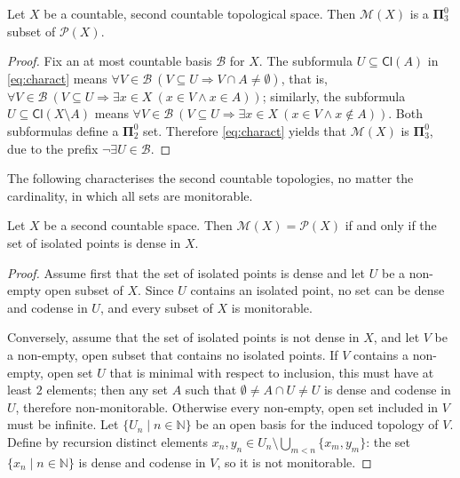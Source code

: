 \documentclass{lmcs}
\newcommand{\N}{\mathbb N}
\newcommand{\bpi}{\boldsymbol\Pi}
\newcommand{\Cl}[1]{\mathsf{Cl}(#1)}
\begin{document}
\begin{prop} \label{countseccount}
Let $X$ be a countable, second countable topological space.
Then $ \mathcal M (X)$ is a $ \bpi^0_3$ subset of $ \mathcal P (X)$.
\end{prop}

\begin{proof}
Fix an at most countable basis $ \mathcal B $ for $X$.
The subformula $U\subseteq \Cl{A} $ in \eqref{eq:charact} means $\forall V\in \mathcal B \ (V\subseteq U\Rightarrow V\cap A\ne\emptyset )$, that is, $\forall V\in \mathcal B \ (V\subseteq U\Rightarrow\exists x\in X\ (x\in V\land x\in A))$; similarly, the subformula $U\subseteq \Cl{X\setminus A} $ means $\forall V\in \mathcal B \ (V\subseteq U\Rightarrow\exists x\in X\ (x\in V\land x\notin A))$.
Both subformulas define a $ \bpi^0_2$ set.
Therefore \eqref{eq:charact} yields that $ \mathcal M (X)$ is $ \bpi^0_3$, due to the prefix $\neg\exists U\in \mathcal B$.
\end{proof}

The following characterises the second countable topologies, no matter the cardinality, in which all sets are monitorable.

\begin{prop} \label{06072025}
Let $X$ be a second countable space.
Then $ \mathcal M (X)= \mathcal P (X)$ if and only if the set of isolated points is dense in $X$.
\end{prop}

\begin{proof}
Assume first that the set of isolated points is dense and let $U$ be a non-empty open subset of $X$.
Since $U$ contains an isolated point, no set can be dense and codense in $U$, and every subset of $X$ is monitorable.

Conversely, assume that the set of isolated points is not dense in $X$, and let $V$ be a non-empty, open subset that contains no isolated points.
If $V$ contains a non-empty, open set $U$ that is minimal with respect to inclusion, this must have at least $2$ elements; then any set $A$ such that $\emptyset\ne A\cap U\ne U$ is dense and codense in $U$, therefore non-monitorable.
Otherwise every non-empty, open set included in $V$ must be infinite.
Let $\{ U_n\mid n\in \N \} $ be an open basis for the induced topology of $V$.
Define by recursion distinct elements $x_n,y_n\in U_n\setminus\bigcup_{m<n}\{ x_m,y_m\} $: the set $\{ x_n\mid n\in \N \} $ is dense and codense in $V$, so it is not monitorable.
\end{proof}
\end{document}
